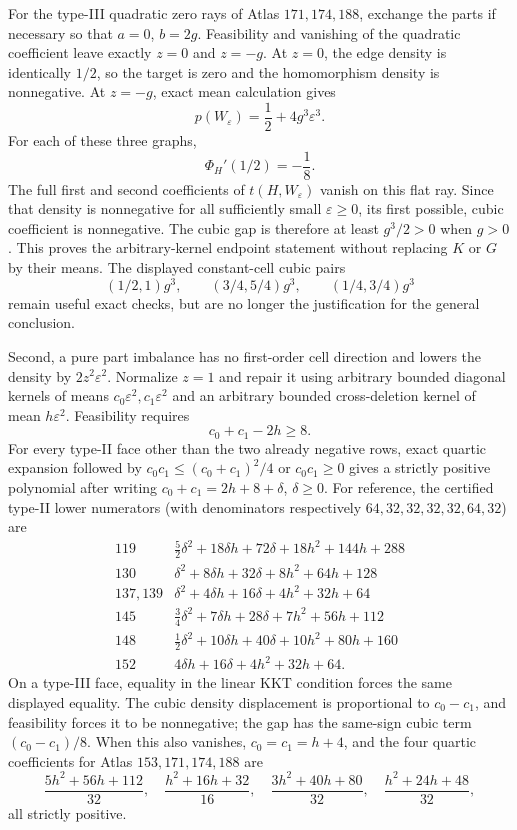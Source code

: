 \documentclass[11pt]{article}
\begin{document}
For the type-III quadratic zero rays of Atlas $171,174,188$, exchange the
parts if necessary so that $a=0$, $b=2g$.  Feasibility and vanishing of the
quadratic coefficient leave exactly $z=0$ and $z=-g$.  At $z=0$, the edge
density is identically $1/2$, so the target is zero and the homomorphism
density is nonnegative.  At $z=-g$, exact mean calculation gives
\[
 p(W_\varepsilon)=\frac12+4g^3\varepsilon^3.
\]
For each of these three graphs,
\[
 \Phi_H'(1/2)=-\frac18.
\]
The full first and second coefficients of $t(H,W_\varepsilon)$ vanish on
this flat ray.  Since that density is nonnegative for all sufficiently small
$\varepsilon\geq0$, its first possible, cubic coefficient is nonnegative.
The cubic gap is therefore at least $g^3/2>0$ when $g>0$.  This proves the
arbitrary-kernel endpoint statement without replacing $K$ or $G$ by their
means.  The displayed constant-cell cubic pairs
\[
 (1/2,1)g^3,\qquad(3/4,5/4)g^3,\qquad(1/4,3/4)g^3
\]
remain useful exact checks, but are no longer the justification for the
general conclusion.

Second, a pure part imbalance has no first-order cell direction and lowers
the density by $2z^2\varepsilon^2$.  Normalize $z=1$ and repair it using
arbitrary bounded diagonal kernels of means
$c_0\varepsilon^2,c_1\varepsilon^2$ and an arbitrary bounded cross-deletion
kernel of mean $h\varepsilon^2$.  Feasibility requires
\[
 c_0+c_1-2h\geq8.
\]
For every type-II face other than the two already negative rows, exact
quartic expansion followed by $c_0c_1\leq(c_0+c_1)^2/4$ or
$c_0c_1\geq0$ gives a strictly positive polynomial after writing
$c_0+c_1=2h+8+\delta$, $\delta\geq0$.  For reference, the certified
type-II lower numerators (with denominators respectively
$64,32,32,32,32,64,32$) are
\[
\begin{array}{c|l}
119&\frac52\delta^2+18\delta h+72\delta+18h^2+144h+288\\
130&\delta^2+8\delta h+32\delta+8h^2+64h+128\\
137,139&\delta^2+4\delta h+16\delta+4h^2+32h+64\\
145&\frac34\delta^2+7\delta h+28\delta+7h^2+56h+112\\
148&\frac12\delta^2+10\delta h+40\delta+10h^2+80h+160\\
152&4\delta h+16\delta+4h^2+32h+64.
\end{array}
\]
On a type-III face, equality in the linear KKT condition forces the same
displayed equality.  The cubic density displacement is proportional to
$c_0-c_1$, and feasibility forces it to be nonnegative; the gap has the
same-sign cubic term $(c_0-c_1)/8$.  When this also vanishes,
$c_0=c_1=h+4$, and the four quartic coefficients for Atlas
$153,171,174,188$ are
\[
 \frac{5h^2+56h+112}{32},\quad
 \frac{h^2+16h+32}{16},\quad
 \frac{3h^2+40h+80}{32},\quad
 \frac{h^2+24h+48}{32},
\]
all strictly positive.
\end{document}
